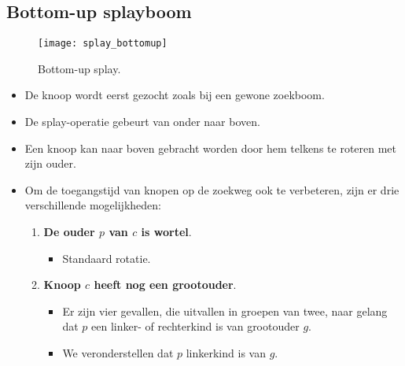 \subsection{Bottom-up splayboom}
\begin{figure}[ht]
    \centering
    \texttt{[image: splay\_bottomup]}
    \caption{Bottom-up splay.}
    \label{fig:splay_bottomup}
\end{figure}
\begin{itemize}
    \item De knoop wordt eerst gezocht zoals bij een gewone zoekboom.
    \item De splay-operatie gebeurt van onder naar boven.
    \item Een knoop kan naar boven gebracht worden door hem telkens te roteren met zijn ouder.
    \item Om de toegangstijd van knopen op de zoekweg ook te verbeteren, zijn er drie verschillende mogelijkheden:
    \begin{enumerate}
        \item \textbf{De ouder $p$ van $c$ is wortel}. 
        \begin{itemize}
            \item Standaard rotatie.
        \end{itemize}
        \item \textbf{Knoop $c$ heeft nog een grootouder}.
        \begin{itemize}
            \item Er zijn vier gevallen, die uitvallen in groepen van twee, naar gelang dat $p$ een linker- of rechterkind is van grootouder $g$.
            \item We veronderstellen dat $p$ linkerkind is van $g$.
        \end{itemize}
        

\end{enumerate}
\end{itemize}
